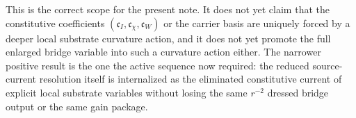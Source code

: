 \documentclass[11pt]{article}
\begin{document}
This is the correct scope for the present note. It does not yet claim that the constitutive coefficients \((\mathfrak c_I,\mathfrak c_\chi,\mathfrak c_W)\) or the carrier basis are uniquely forced by a deeper local substrate curvature action, and it does not yet promote the full enlarged bridge variable into such a curvature action either. The narrower positive result is the one the active sequence now required: the reduced source-current resolution itself is internalized as the eliminated constitutive current of explicit local substrate variables without losing the same \(r^{-2}\) dressed bridge output or the same gain package.
\end{document}
